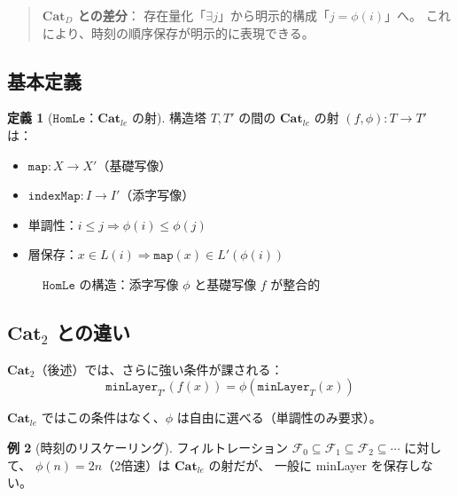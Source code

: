 \documentclass{ltjsarticle}
\theoremstyle{definition}
\newtheorem{definition}{定義}[section]
\newtheorem{example}[definition]{例}
\newcommand{\catD}{\mathbf{Cat}_D}
\newcommand{\catle}{\mathbf{Cat}_{le}}
\newcommand{\cattwo}{\mathbf{Cat}_2}
\newcommand{\HomLe}{\mathtt{HomLe}}
\newcommand{\minLayer}{\mathtt{minLayer}}
\newcommand{\indexMap}{\mathtt{indexMap}}
\begin{document}
\begin{quote}
\textbf{$\catD$ との差分}：
存在量化「$\exists j$」から明示的構成「$j = \phi(i)$」へ。
これにより、時刻の順序保存が明示的に表現できる。
\end{quote}

\subsection{基本定義}

\begin{definition}[$\HomLe$：$\catle$ の射]
\label{def:hom-le}
構造塔 $T, T'$ の間の $\catle$ の射 $(f, \phi) : T \to T'$ は：
\begin{itemize}
  \item $\mathtt{map} : X \to X'$（基礎写像）
  \item $\indexMap : I \to I'$（添字写像）
  \item 単調性：$i \leq j \Rightarrow \phi(i) \leq \phi(j)$
  \item 層保存：$x \in L(i) \Rightarrow \mathtt{map}(x) \in L'(\phi(i))$
\end{itemize}
\end{definition}

\begin{figure}[htbp]
\centering
{}
\caption{$\HomLe$ の構造：添字写像 $\phi$ と基礎写像 $f$ が整合的}
\label{fig:hom-le-structure}
\end{figure}

\subsection{$\cattwo$ との違い}

$\cattwo$（後述）では、さらに強い条件が課される：
\[
  \minLayer_{T'}(f(x)) = \phi(\minLayer_T(x))
\]

$\catle$ ではこの条件はなく、$\phi$ は自由に選べる（単調性のみ要求）。

\begin{example}[時刻のリスケーリング]
フィルトレーション $\mathcal{F}_0 \subseteq \mathcal{F}_1 \subseteq \mathcal{F}_2 \subseteq \cdots$ に対して、
$\phi(n) = 2n$（2倍速）は $\catle$ の射だが、
一般に minLayer を保存しない。
\end{example}
\end{document}
